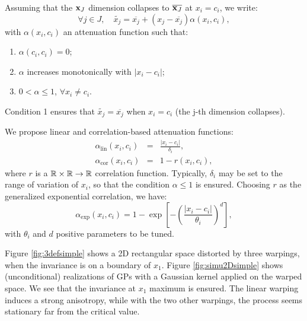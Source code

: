 Assuming that the $\mathbf{x}_J$ dimension collapses to $\overline{\mathbf{x}_J}$ at $x_i=c_i$, we write:
\begin{equation}
 \forall j \in J, \quad \widetilde{x_j} = \overline{x_j} + \left( x_j - \overline{x_j}\right)\alpha(x_i, c_i),
\end{equation}
with $\alpha(x_i, c_i)$ an attenuation function such that:
\begin{enumerate}
 \item $\alpha(c_i, c_i) = 0$;
 \item $\alpha$ increases monotonically with $\lvert x_i - c_i\rvert$;
 \item $0 < \alpha \leq 1$, $\forall x_i \neq c_i$.
\end{enumerate}
Condition 1 ensures that $\widetilde{x_j} = \overline{x_j}$ when $x_i=c_i$ (the j-th dimension collapses).

We propose linear and correlation-based attenuation functions: 
\begin{eqnarray}
 \alpha_\text{lin}(x_i, c_i) &=& \frac{\lvert x_i - c_i \rvert}{\delta_i}, \\
 \alpha_\text{cor}(x_i, c_i) &=& 1 - r(x_i, c_i),
\end{eqnarray}
where $r$ is a $\mathbb{R} \times \mathbb{R}\rightarrow \mathbb{R}$ correlation function.
Typically, $\delta_i$ may be set to the range of variation of $x_i$, so that the condition $\alpha \leq 1$ is ensured.
Choosing $r$ as the generalized exponential correlation, we have:
\begin{equation}
   \alpha_\text{exp}(x_i, c_i) = 1 - \exp \left[ - \left(\frac{\lvert x_i - c_i \rvert}{\theta_i}\right)^d \right],
\end{equation}
with $\theta_i$ and $d$ positive parameters to be tuned. 

Figure \ref{fig:3defsimple} shows a 2D rectangular space distorted by three warpings, when the invariance is on a boundary of $x_1$.
Figure \ref{fig:simu2Dsimple} shows (unconditional) realizations of GPs with a Gaussian kernel applied on the warped space. 
We see that the invariance at $x_1$ maximum is ensured. The linear warping induces a strong anisotropy, while with the two other warpings,
the process seems stationary far from the critical value.

